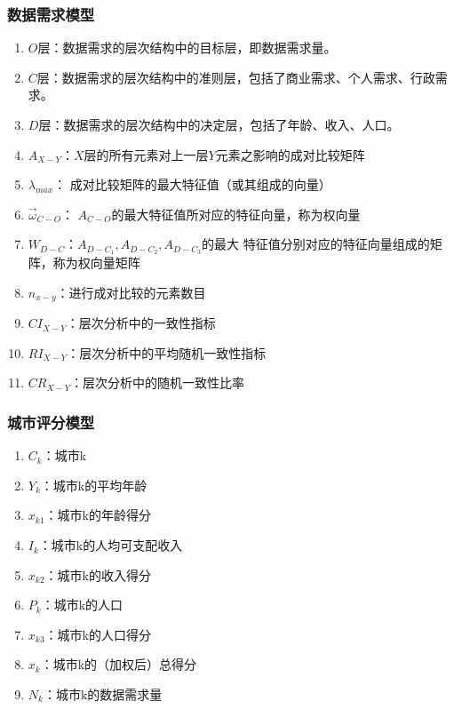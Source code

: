 \documentclass[UTF8,12pt]{ctexart}
\begin{document}
\subsubsection{数据需求模型}
\begin{enumerate}
    \item $O$层：数据需求的层次结构中的目标层，即数据需求量。
    \item $C$层：数据需求的层次结构中的准则层，包括了商业需求、个人需求、行政需求。
    \item $D$层：数据需求的层次结构中的决定层，包括了年龄、收入、人口。
    \item $A_{X-Y}$：$X$层的所有元素对上一层$Y$元素之影响的成对比较矩阵
    \item $\lambda _{max}$：
          成对比较矩阵的最大特征值（或其组成的向量）
    \item $\overrightarrow\omega _{C-O}$：
          $A_{C-O}$的最大特征值所对应的特征向量，称为权向量
    \item $W_{D-C}$：$A_{D-C_1},A_{D-C_2},A_{D-C_3}$的最大
          特征值分别对应的特征向量组成的矩阵，称为权向量矩阵
    \item $n_{x-y}$：进行成对比较的元素数目
    \item $CI_{X-Y}$：层次分析中的一致性指标
    \item $RI_{X-Y}$：层次分析中的平均随机一致性指标
    \item $CR_{X-Y}$：层次分析中的随机一致性比率
\end{enumerate}

\subsubsection{城市评分模型}
\begin{enumerate}
    \item $C_k$：城市k
    \item $Y_k$：城市k的平均年龄
    \item $x_{k1}$：城市k的年龄得分
    \item $I_k$：城市k的人均可支配收入
    \item $x_{k2}$：城市k的收入得分
    \item $P_k$：城市k的人口
    \item $x_{k3}$：城市k的人口得分
    \item $x_k$：城市k的（加权后）总得分
    \item $N_k$：城市k的数据需求量
\end{enumerate}
\end{document}

